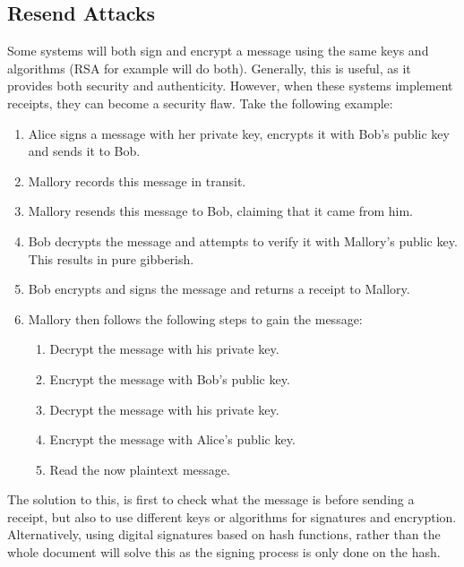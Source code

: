 		\subsection{Resend Attacks}
			Some systems will both sign and encrypt a message using the same keys and algorithms (RSA for example will do both). 
			Generally, this is useful, as it provides both security and authenticity. 
			However, when these systems implement receipts, they can become a security flaw. 
			Take the following example:
			\begin{enumerate}
				\item Alice signs a message with her private key, encrypts it with Bob's public key and sends it to Bob. 
				\item Mallory records this message in transit. 
				\item Mallory resends this message to Bob, claiming that it came from him. 
				\item Bob decrypts the message and attempts to verify it with Mallory's public key. 
					This results in pure gibberish. 
				\item Bob encrypts and signs the message and returns a receipt to Mallory. 
				\item Mallory then follows the following steps to gain the message:
					\begin{enumerate}
						\item Decrypt the message with his private key. 
						\item Encrypt the message with Bob's public key. 
						\item Decrypt the message with his private key. 
						\item Encrypt the message with Alice's public key. 
						\item Read the now plaintext message. 
					\end{enumerate}
			\end{enumerate}

			The solution to this, is first to check what the message is before sending a receipt, but also to use different keys or algorithms for signatures and encryption. 
			Alternatively, using digital signatures based on hash functions, rather than the whole document will solve this as the signing process is only done on the hash. 

